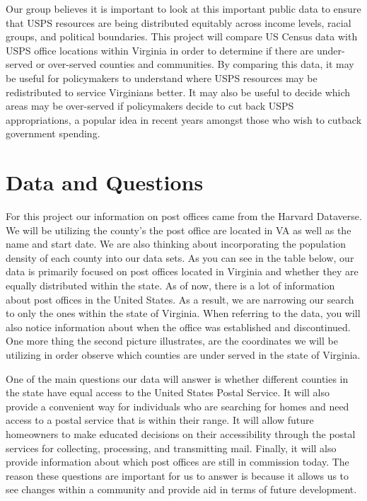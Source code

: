 \documentclass[11pt]{article}
\begin{document}
Our group believes it is important to look at this important public data to ensure that USPS resources are being distributed equitably across income levels, racial groups, and political boundaries. This project will compare US Census data with USPS office locations within Virginia in order to determine if there are under-served or over-served counties and communities. By comparing this data, it may be useful for policymakers to understand where USPS resources may be redistributed to service Virginians better. It may also be useful to decide which areas may be over-served if policymakers decide to cut back USPS appropriations, a popular idea in recent years amongst those who wish to cutback government spending. 

\section*{Data and Questions}



For this project our information on post offices came from the Harvard Dataverse. We will be utilizing the county's the post office are located in VA as well as the name and start date. We are also thinking about incorporating the population density of each county into our data sets. As you can see in the table below, our data is primarily focused on post offices located in Virginia and whether they are equally distributed within the state. As of now, there is a lot of information about post offices in the United States. As a result, we are narrowing our search to only the ones within the state of Virginia. When referring to the data, you will also notice information about when the office was established and discontinued. One more thing the second picture illustrates, are the coordinates we will be utilizing in order observe which counties are under served in the state of Virginia. 

One of the main questions our data will answer is whether different counties in the state have equal access to the United States Postal Service. It will also provide a convenient way for individuals who are searching for homes and need access to a postal service that is within their range. It will allow future homeowners to make educated decisions on their accessibility through the postal services for collecting, processing, and transmitting mail. Finally, it will also provide information about which post offices are still in commission today. The reason these questions are important for us to answer is because it allows us to see changes within a community and provide aid in terms of future development.
\end{document}
